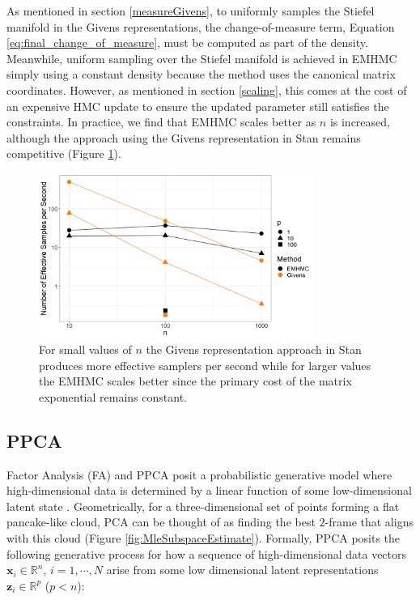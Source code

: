 \documentclass[ba]{imsart}
\numberwithin{equation}{section}
\theoremstyle{plain}
\begin{document}
\noindent As mentioned in section \ref{measureGivens}, to uniformly samples the Stiefel manifold in the Givens representations, the change-of-measure term, Equation \ref{eq:final_change_of_measure}, must be computed as part of the density. Meanwhile, uniform sampling over the Stiefel manifold is achieved in EMHMC simply using a constant density because the method uses the canonical matrix coordinates. However, as mentioned in section \ref{scaling}, this comes at the cost of an expensive HMC update to ensure the updated parameter still satisfies the constraints. In practice, we find that EMHMC scales better as $n$ is increased, although the approach using the Givens representation in Stan remains competitive (Figure \ref{fig:scaling}).

\begin{figure}[h]
\centering
\vspace{.1in}
\includegraphics[width=0.8\textwidth]{figures/scaling.png}
\vspace{.05in}
\caption{For small values of $n$ the Givens representation approach in Stan produces more effective samplers per second while for larger values the EMHMC scales better since the primary cost of the matrix exponential remains constant.}
\label{fig:scaling}
\end{figure}

\subsection{PPCA}
Factor Analysis (FA) and PPCA \citep{tipping1999probabilistic} posit a probabilistic generative model where high-dimensional data is determined by a linear function of some low-dimensional latent state \cite[Chapt.~12]{murphy2012machine}. Geometrically, for a three-dimensional set of points forming a flat pancake-like cloud, PCA can be thought of as finding the best $2$-frame that aligns with this cloud (Figure \ref{fig:MleSubspaceEstimate}). Formally, PPCA posits the following generative process for how a sequence of high-dimensional data vectors $\mathbf{x}_i \in \mathbb{R}^n$, $i = 1, \cdots, N$ arise from some low dimensional latent representations $\mathbf{z}_i \in \mathbb{R}^p$ ($p < n$):
\end{document}
